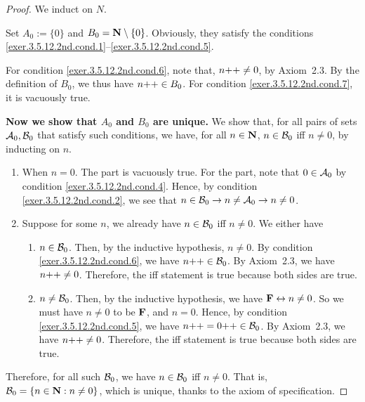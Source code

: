 \begin{proof}
	We induct on $N$.
	
	\mybcbox Set $A_0 := \{0\}$ and $B_0 = \mathbf{N} \setminus \{0\}$. Obviously, they satisfy the conditions \ref{exer.3.5.12.2nd.cond.1}--\ref{exer.3.5.12.2nd.cond.5}.
	
	For condition \ref{exer.3.5.12.2nd.cond.6}, note that, $n{+}{+} \ne 0$, by Axiom~2.3. By the definition of $B_0$, we thus have $n{+}{+} \in B_0$. For condition \ref{exer.3.5.12.2nd.cond.7}, it is vacuously true.
	
	\textbf{Now we show that $A_0$ and $B_0$ are unique.}%
	\begingroup
	\def\azro{{\cal A}_0}%
	\def\bzro{{\cal B}_0}%
	We show that, for all pairs of sets $\azro,\bzro$ that satisfy such conditions, we have, for all $n \in \mathbf{N}$, $n \in \bzro$ iff $n \ne 0$, by inducting on $n$.
	\begin{enumerate}
		\item \mybcbox When $n = 0$. The \myifbox part is vacuously true. For the \myoifbox part, note that $0 \in \azro$ by condition \ref{exer.3.5.12.2nd.cond.4}. Hence, by condition \ref{exer.3.5.12.2nd.cond.2}, we see that $n \in \bzro \to n \ne \azro \to n \ne 0$.
		
		\item \myisbox Suppose for some $n$, we already have $n \in \bzro$ iff $n \ne 0$. We either have 
		\begin{enumerate}
			\item $n \in \bzro$. Then, by the inductive hypothesis, $n \ne 0$. By condition \ref{exer.3.5.12.2nd.cond.6}, we have $\successor{n} \in \bzro$. By Axiom~2.3, we have $n{+}{+} \ne 0$. Therefore, the iff statement is true because both sides are true.
			
			\item $n \ne \bzro$. Then, by the inductive hypothesis, we have $\mathbf{F} \leftrightarrow n \ne 0$. So we must have $n \ne 0$ to be $\mathbf{F}$, and $n = 0$. Hence, by condition \ref{exer.3.5.12.2nd.cond.5}, we have $\successor{n} = \successor{0} \in \bzro$. By Axiom~2.3, we have $n{+}{+} \ne 0$. Therefore, the iff statement is true because both sides are true.
		\end{enumerate} 
	\end{enumerate}

	Therefore, for all such $\bzro$, we have $n \in \bzro$ iff $n \ne 0$. That is, $\bzro = \{n \in \setn : n \ne 0\}$, which is unique, thanks to the axiom of specification. 
	

\end{proof}

